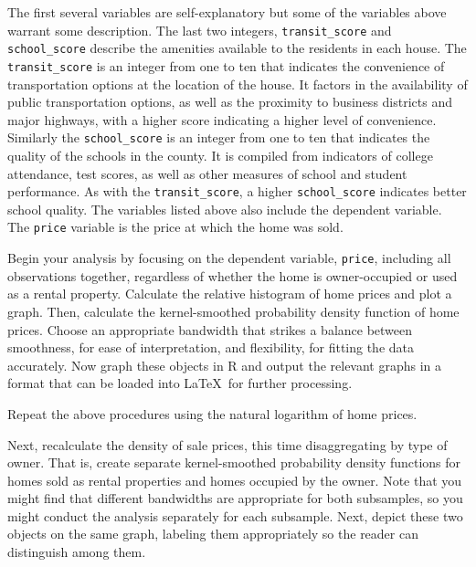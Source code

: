\documentclass[11pt]{article}
\begin{document}
\bigskip
\noindent



\bigskip
The first several variables are self-explanatory 
but some of the variables above warrant some description.
The last two integers, \texttt{transit\_score} and \texttt{school\_score}
describe the amenities available to the residents in each house. 
The {\tt transit\_score} is an integer from one to ten that indicates the 
convenience of transportation options at the location of the house. 
It factors in the availability of public transportation options, 
as well as the proximity to business districts and major highways, 
with a higher score indicating a higher level of convenience. 
Similarly the {\tt school\_score} is an integer from one to ten that indicates the 
quality of the schools in the county. 
It is compiled from indicators of college attendance, test scores, 
as well as other measures of school and student performance.
As with the {\tt transit\_score}, a higher {\tt school\_score}
indicates better school quality. 
The variables listed above also include the dependent variable. 
The {\tt price} variable is the price at which the home was sold. 



\medskip
Begin your analysis by focusing on the dependent variable, {\tt price},
including all observations together, regardless of 
whether the home is owner-occupied or used as a rental property.
Calculate the relative histogram of home prices and plot a graph.
Then, calculate the kernel-smoothed probability density function of 
home prices. 
Choose an appropriate bandwidth that strikes a balance between
smoothness, for ease of interpretation, and flexibility, for fitting the data accurately. 
Now graph these objects in \textsf{R} and output the relevant graphs in a format 
that can be loaded into \LaTeX\ for further processing.


\medskip
Repeat the above procedures using 
the natural logarithm of home prices.




\medskip
Next, recalculate the density of sale prices,
this time disaggregating by type of owner.
That is, create separate kernel-smoothed probability density functions
for homes sold as rental properties and homes occupied by the owner. 
Note that you might find that different bandwidths
are appropriate for both subsamples, 
so you might conduct the analysis separately for each subsample. 
Next, depict these two objects on the same graph, labeling them appropriately
so the reader can distinguish among them.
\end{document}
